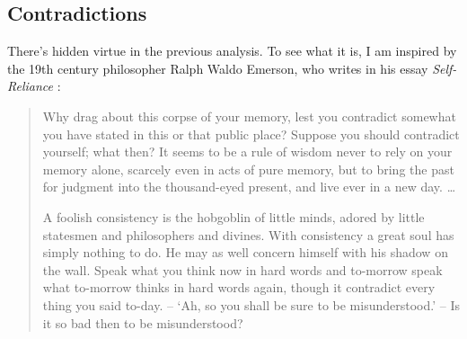 \documentclass[11pt]{article}
\numberwithin{equation}{subsection}
\begin{document}
\subsection{Contradictions}\label{contradictions}

There's hidden virtue in the previous analysis.  To see what it is, I
am inspired by the 19th century philosopher Ralph Waldo Emerson, who
writes in his essay \emph{Self-Reliance} \citep{emerson_essays_2008}:
\begin{quote}
{ Why drag about this corpse of your memory, lest you contradict
  somewhat you have stated in this or that public place? Suppose you
  should contradict yourself; what then? It seems to be a rule of
  wisdom never to rely on your memory alone, scarcely even in acts of
  pure memory, but to bring the past for judgment into the
  thousand-eyed present, and live ever in a new day. \ldots}

{A foolish consistency is the hobgoblin of little minds, adored by
  little statesmen and philosophers and divines. With consistency a
  great soul has simply nothing to do. He may as well concern himself
  with his shadow on the wall. Speak what you think now in hard words
  and to-morrow speak what to-morrow thinks in hard words again, 
though it contradict every thing you said to-day. 
-- `Ah, so you shall be sure to be misunderstood.' -- Is it so bad
then to be misunderstood? }
\end{quote}
\end{document}
